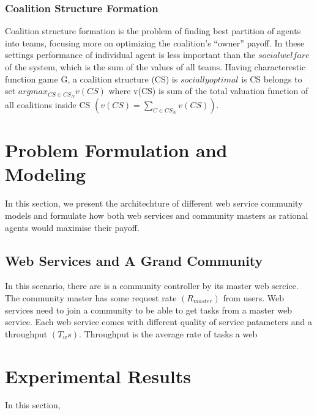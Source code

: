 \documentclass[10pt, conference, compsocconf]{IEEEtran}
\theoremstyle{plain}
\theoremstyle{definition}
\begin{document}
\subsubsection{Coalition Structure Formation}

Coalition structure formation is the problem of finding best partition of agents into teams, focusing more on optimizing the coalition's ``owner'' payoff. In these settings performance of individual agent is less important than the $social welfare$ of the system, which is the sum of the values of all teams. Having characterestic function game G, a coalition structure (CS) is $socially optimal$ is CS belongs to set $argmax_{CS \in CS_N}v(CS)$ where v(CS) is sum of the total valuation function of all coalitions inside CS $(v(CS) = \sum_{C \in CS_N}v(CS))$.

\section{Problem Formulation and Modeling}

In this section, we present the architechture of different web service community models and formulate how both web services and community masters as rational agents would maximise their payoff.

\subsection {Web Services and A Grand Community}

In this scenario, there are is a community controller by its master web sercice. The community master has some request rate $(R_{master})$ from users. Web services need to join a community to be able to get tasks from a master web service. Each web service comes with different quality of service patameters and a throughput $(T_ws)$. Throughput is the average rate of tasks a web 


\section{Experimental Results}

In this section, 
\end{document}
